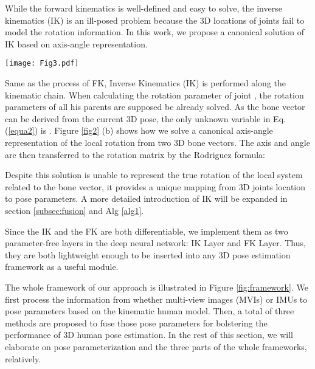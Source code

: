 \documentclass[lettersize,journal]{IEEEtran}
\begin{document}
While the forward kinematics is well-defined and easy to solve, the inverse kinematics (IK) is an ill-posed problem because the 3D locations of joints fail to model the rotation information. In this work, we propose a canonical solution of IK based on axis-angle representation.

\begin{figure*}[ht]
 \begin{center}
 	\centerline{\texttt{[image: Fig3.pdf]}}
\caption{The proposed IMU-vision fusion framework for parametric 3D human pose estimation. The 3D pose  estimated from multi-view images is parameterized to local rotations  via IK layer. The IMU raw data is also processed to local rotations  or bone vectors  and is integrated with vision data ( or ) by three fusion approaches: \emph{NaiveFuse}, \emph{KineFuse} and \emph{AdaDeepFuse}. The final fused 3D poses of \emph{KineFuse} and \emph{AdaDeepFuse} are generated via FK layer. Only \emph{AdaDeepFuse} needs to be trained end-to-end.}
\label{fig:framework}
\end{center}
\end{figure*}

Same as the process of FK, Inverse Kinematics (IK) is performed along the kinematic chain. When calculating the rotation parameter  of joint , the rotation parameters of all his parents  are supposed be already solved. As the bone vector  can be derived from the current 3D pose, the only unknown variable in Eq. (\ref{equa2}) is . Figure \ref{fig2} (b) shows how we solve a canonical axis-angle representation of the local rotation from two 3D bone vectors. The axis  and angle  are then transferred to the rotation matrix by the Rodriguez formula: 

Despite this solution is unable to represent the true rotation of the local system related to the bone vector, it provides a unique mapping from 3D joints location to pose parameters. A more detailed introduction of IK will be expanded in section \ref{subsec:fusion} and Alg \ref{alg1}.

Since the IK and the FK are both differentiable, we implement them as two parameter-free layers in the deep neural network: IK Layer and FK Layer. Thus, they are both lightweight enough to be inserted into any 3D pose estimation framework as a useful module.

The whole framework of our approach is illustrated in Figure \ref{fig:framework}. We first process the information from whether multi-view images (MVIs) or IMUs to pose parameters based on the kinematic human model. Then, a total of three methods are proposed to fuse those pose parameters for bolstering the performance of 3D human pose estimation. In the rest of this section, we will elaborate on pose parameterization and the three parts of the whole frameworks, relatively.
\end{document}
